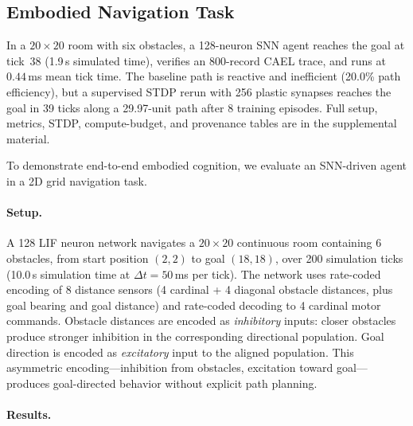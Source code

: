 \documentclass[10pt]{article}
\newcommand{\cael}{\textsc{CAEL}}
\begin{document}
\subsection{Embodied Navigation Task}
\label{sec:embodied}

In a $20\times20$ room with six obstacles, a 128-neuron SNN agent reaches the
goal at tick~38 (1.9\,s simulated time), verifies an 800-record \cael{} trace,
and runs at $0.44$\,ms mean tick time.
The baseline path is reactive and inefficient (20.0\% path efficiency), but a
supervised STDP rerun with 256 plastic synapses reaches the goal in 39 ticks
along a 29.97-unit path after 8 training episodes.
Full setup, metrics, STDP, compute-budget, and provenance tables are in the
supplemental material.

\iffalse
To demonstrate end-to-end embodied cognition, we evaluate an SNN-driven agent
in a 2D grid navigation task.

\paragraph{Setup.}
A 128 LIF neuron network navigates a $20 \times 20$ continuous room containing
6 obstacles, from start position $(2, 2)$ to goal $(18, 18)$, over 200 simulation
ticks (10.0\,s simulation time at $\Delta t = 50$\,ms per tick).
The network uses rate-coded encoding of 8 distance sensors (4 cardinal +
4 diagonal obstacle distances, plus goal bearing and goal distance) and
rate-coded decoding to 4 cardinal motor commands.
Obstacle distances are encoded as \emph{inhibitory} inputs: closer obstacles
produce stronger inhibition in the corresponding directional population.
Goal direction is encoded as \emph{excitatory} input to the aligned population.
This asymmetric encoding---inhibition from obstacles, excitation toward
goal---produces goal-directed behavior without explicit path planning.

\paragraph{Results.}
\end{document}
